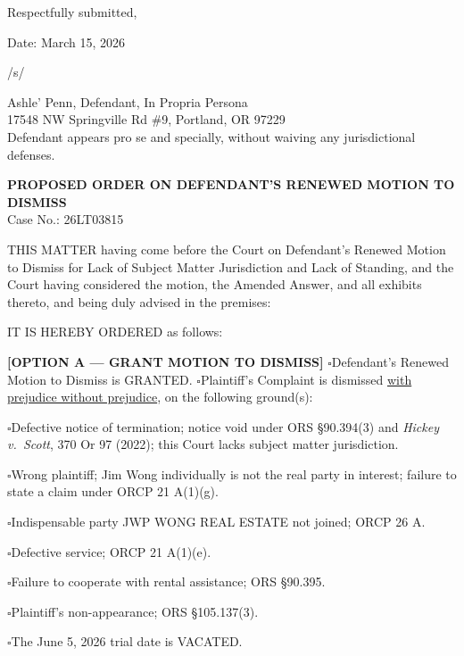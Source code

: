 \documentclass[12pt,letterpaper]{article}
\begin{document}
	Respectfully submitted,
	
	Date: March 15, 2026
	
	/s/
	
	Ashle' Penn, Defendant, In Propria Persona \\
	17548 NW Springville Rd \#9, Portland, OR 97229 \\
	Defendant appears pro se and specially, without waiving any jurisdictional defenses.
	
	\newpage
	\begin{center}
		\textbf{PROPOSED ORDER ON DEFENDANT'S RENEWED MOTION TO DISMISS} \\
		Case No.: 26LT03815
	\end{center}
	
	THIS MATTER having come before the Court on Defendant's Renewed Motion to Dismiss for Lack of Subject Matter Jurisdiction and Lack of Standing, and the Court having considered the motion, the Amended Answer, and all exhibits thereto, and being duly advised in the premises:
	
	IT IS HEREBY ORDERED as follows:
	
	\textbf{[OPTION A --- GRANT MOTION TO DISMISS]} \ensuremath{\square}Defendant's Renewed Motion to Dismiss is GRANTED. \ensuremath{\square}Plaintiff's Complaint is dismissed \underline{\hspace{1.5in} with prejudice \hspace{1.5in} without prejudice}, on the following ground(s):
	
	\ensuremath{\square}Defective notice of termination; notice void under ORS \S90.394(3) and \textit{Hickey v.\ Scott}, 370 Or 97 (2022); this Court lacks subject matter jurisdiction.
	
	\ensuremath{\square}Wrong plaintiff; Jim Wong individually is not the real party in interest; failure to state a claim under ORCP 21 A(1)(g).
	
	\ensuremath{\square}Indispensable party JWP WONG REAL ESTATE not joined; ORCP 26 A.
	
	\ensuremath{\square}Defective service; ORCP 21 A(1)(e).
	
	\ensuremath{\square}Failure to cooperate with rental assistance; ORS \S90.395.
	
	\ensuremath{\square}Plaintiff's non-appearance; ORS \S105.137(3).
	
	\ensuremath{\square}The June 5, 2026 trial date is VACATED.
	
\end{document}
